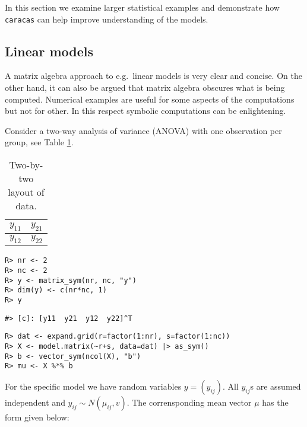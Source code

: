 In this section we examine larger statistical examples and
demonstrate how \texttt{caracas} can help improve understanding of the models.

\hypertarget{linear-models}{%
\subsection{Linear models}\label{linear-models}}

A matrix algebra approach to e.g.~linear models is very clear and
concise. On the other hand, it can also be argued that matrix algebra
obscures what is being computed. Numerical examples are useful for
some aspects of the computations but not for other. In this respect
symbolic computations can be enlightening.

Consider a two-way analysis of variance (ANOVA) with one observation
per group, see Table \ref{tab:anova-two-way-table}.

\begin{table}[!h]

\caption{\label{tab:anova-two-way-table}Two-by-two layout of data.}
\centering
\begin{tabular}[t]{|>{}l|>{}l|}
\hline
$y_{11}$ & $y_{21}$\\
\hline
$y_{12}$ & $y_{22}$\\
\hline
\end{tabular}
\end{table}

\begin{verbatim}
R> nr <- 2
R> nc <- 2
R> y <- matrix_sym(nr, nc, "y")
R> dim(y) <- c(nr*nc, 1)
R> y
\end{verbatim}

\begin{verbatim}
#> [c]: [y11  y21  y12  y22]^T
\end{verbatim}

\begin{verbatim}
R> dat <- expand.grid(r=factor(1:nr), s=factor(1:nc))
R> X <- model.matrix(~r+s, data=dat) |> as_sym()
R> b <- vector_sym(ncol(X), "b")
R> mu <- X %*% b
\end{verbatim}

For the specific model we have random variables \(y=(y_{ij})\). All \(y_{ij}\)s are assumed independent and \(y_{ij}\sim N(\mu_{ij}, v)\).
The corrensponding mean vector \(\mu\) has the form given below:

